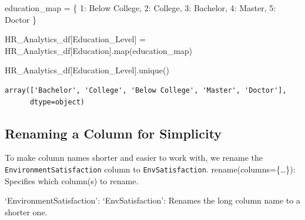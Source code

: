 \documentclass[
  letterpaper,
  DIV=11,
  numbers=noendperiod]{scrartcl}
\newenvironment{Shaded}{\begin{snugshade}}{\end{snugshade}}
\newcommand{\BuiltInTok}[1]{\textcolor[rgb]{0.00,0.23,0.31}{#1}}
\newcommand{\DecValTok}[1]{\textcolor[rgb]{0.68,0.00,0.00}{#1}}
\newcommand{\NormalTok}[1]{\textcolor[rgb]{0.00,0.23,0.31}{#1}}
\newcommand{\OperatorTok}[1]{\textcolor[rgb]{0.37,0.37,0.37}{#1}}
\newcommand{\StringTok}[1]{\textcolor[rgb]{0.13,0.47,0.30}{#1}}
\begin{document}
\begin{Shaded}
\begin{Highlighting}[]
\NormalTok{education\_map }\OperatorTok{=}\NormalTok{ \{}
    \DecValTok{1}\NormalTok{: }\StringTok{\textquotesingle{}Below College\textquotesingle{}}\NormalTok{,}
    \DecValTok{2}\NormalTok{: }\StringTok{\textquotesingle{}College\textquotesingle{}}\NormalTok{,}
    \DecValTok{3}\NormalTok{: }\StringTok{\textquotesingle{}Bachelor\textquotesingle{}}\NormalTok{,}
    \DecValTok{4}\NormalTok{: }\StringTok{\textquotesingle{}Master\textquotesingle{}}\NormalTok{,}
    \DecValTok{5}\NormalTok{: }\StringTok{\textquotesingle{}Doctor\textquotesingle{}}
\NormalTok{\}}
\end{Highlighting}
\end{Shaded}

\begin{Shaded}
\begin{Highlighting}[]
\NormalTok{HR\_Analytics\_df[}\StringTok{\textquotesingle{}Education\_Level\textquotesingle{}}\NormalTok{] }\OperatorTok{=}\NormalTok{ HR\_Analytics\_df[}\StringTok{\textquotesingle{}Education\textquotesingle{}}\NormalTok{].}\BuiltInTok{map}\NormalTok{(education\_map) }
\end{Highlighting}
\end{Shaded}

\begin{Shaded}
\begin{Highlighting}[]
\NormalTok{HR\_Analytics\_df[}\StringTok{\textquotesingle{}Education\_Level\textquotesingle{}}\NormalTok{].unique()}
\end{Highlighting}
\end{Shaded}

\begin{verbatim}
array(['Bachelor', 'College', 'Below College', 'Master', 'Doctor'],
      dtype=object)
\end{verbatim}

\subsection{Renaming a Column for
Simplicity}\label{renaming-a-column-for-simplicity}

To make column names shorter and easier to work with, we rename the
\texttt{EnvironmentSatisfaction} column to \texttt{EnvSatisfaction}.
rename(columns=\{\ldots\}): Specifies which column(s) to rename.

`EnvironmentSatisfaction': `EnvSatisfaction': Renames the long column
name to a shorter one.
\end{document}
